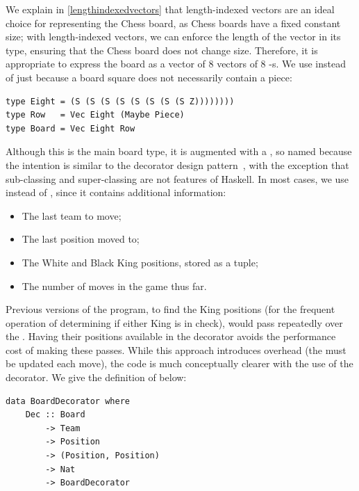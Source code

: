 We explain in \cref{lengthindexedvectors} that length-indexed vectors are an ideal choice for representing the Chess board, as Chess boards have a fixed constant size; with length-indexed vectors, we can enforce the length of the vector in its type, ensuring that the Chess board does not change size. Therefore, it is appropriate to express the board as a vector of 8 vectors of 8 -s. We use  instead of just  because a board square does not necessarily contain a piece:

\begin{lstlisting}
type Eight = (S (S (S (S (S (S (S (S Z))))))))
type Row   = Vec Eight (Maybe Piece)
type Board = Vec Eight Row
\end{lstlisting}

Although this is the main board type, it is augmented with a , so named because the intention is similar to the decorator design pattern~\cite{decorator}, with the exception that sub-classing and super-classing are not features of Haskell. In most cases, we use  instead of , since it contains additional information:

\begin{itemize}
    \item The last team to move;
    \item The last position moved to;
    \item The White and Black King positions, stored as a tuple;
    \item The number of moves in the game thus far.
\end{itemize}

Previous versions of the program, to find the King positions (for the frequent operation of determining if either King is in check), would pass repeatedly over the . Having their positions available in the decorator avoids the performance cost of making these passes. While this approach introduces overhead (the  must be updated each move), the code is much conceptually clearer with the use of the decorator. We give the definition of  below:

\begin{lstlisting}
data BoardDecorator where
    Dec :: Board
        -> Team
        -> Position
        -> (Position, Position)
        -> Nat
        -> BoardDecorator
\end{lstlisting}

